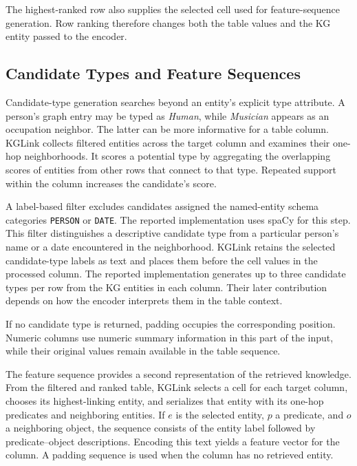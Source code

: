 The highest-ranked row also supplies the selected cell used for feature-sequence generation. Row ranking therefore changes both the table values and the KG entity passed to the encoder.

\subsection{Candidate Types and Feature Sequences}
\label{sec:kglink:types-features}

Candidate-type generation searches beyond an entity's explicit type attribute. A person's graph entry may be typed as \emph{Human}, while \emph{Musician} appears as an occupation neighbor. The latter can be more informative for a table column. KGLink collects filtered entities across the target column and examines their one-hop neighborhoods. It scores a potential type by aggregating the overlapping scores of entities from other rows that connect to that type. Repeated support within the column increases the candidate's score.

A label-based filter excludes candidates assigned the named-entity schema categories \texttt{PERSON} or \texttt{DATE}. The reported implementation uses spaCy for this step. This filter distinguishes a descriptive candidate type from a particular person's name or a date encountered in the neighborhood. KGLink retains the selected candidate-type labels as text and places them before the cell values in the processed column. The reported implementation generates up to three candidate types per row from the KG entities in each column. Their later contribution depends on how the encoder interprets them in the table context.

If no candidate type is returned, padding occupies the corresponding position. Numeric columns use numeric summary information in this part of the input, while their original values remain available in the table sequence.

The feature sequence provides a second representation of the retrieved knowledge. From the filtered and ranked table, KGLink selects a cell for each target column, chooses its highest-linking entity, and serializes that entity with its one-hop predicates and neighboring entities. If $e$ is the selected entity, $p$ a predicate, and $o$ a neighboring object, the sequence consists of the entity label followed by predicate--object descriptions. Encoding this text yields a feature vector for the column. A padding sequence is used when the column has no retrieved entity.

